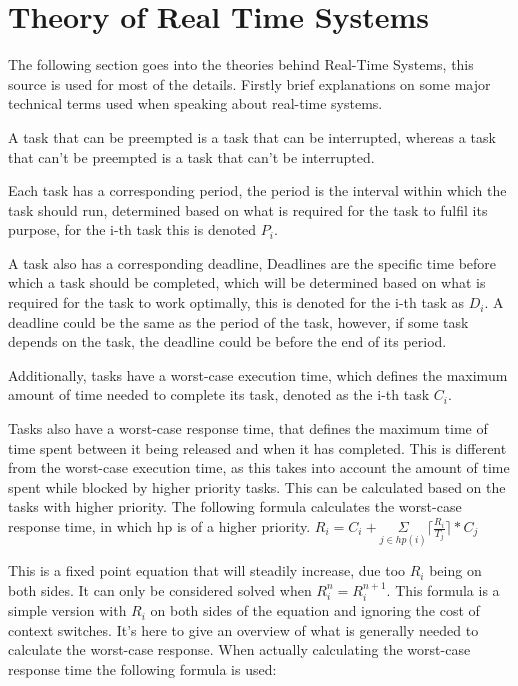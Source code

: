 \section{Theory of Real Time Systems}
The following section goes into the theories behind Real-Time Systems, this source\cite{RTSbook} is used for most of the details. Firstly brief explanations on some major technical terms used when speaking about real-time systems. %

A task that can be preempted is a task that can be interrupted, whereas a task that can't be preempted is a task that can't be interrupted.

Each task has a corresponding period, the period is the interval within which the task should run, determined based on what is required for the task to fulfil its purpose, for the i-th task this is denoted $P_{i}$.

A task also has a corresponding deadline, Deadlines are the specific time before which a task should be completed, which will be determined based on what is required for the task to work optimally, this is denoted for the i-th task as $ D_{i} $. A deadline could be the same as the period of the task, however, if some task depends on the task, the deadline could be before the end of its period. 

Additionally, tasks have a worst-case execution time, which defines the maximum amount of time needed to complete its task, denoted as the i-th task $C_{i}$.

Tasks also have a worst-case response time, that defines the maximum time of time spent between it being released and when it has completed. This is different from the worst-case execution time, as this takes into account the amount of time spent while blocked by higher priority tasks. This can be calculated based on the tasks with higher priority. The following formula calculates the worst-case response time, in which hp is of a higher priority. 
$R_{i} = C_{i} + \underset{j\in hp(i)}{\Sigma} \lceil\frac{R_{i}}{T_{j}}\rceil*C_{j} $

This is a fixed point equation that will steadily increase, due too $R_{i}$ being on both sides. It can only be considered solved when $ R_{i}^n = R_{i}^{n+1}$. This formula is a simple version with $R_{i}$ on both sides of the equation and ignoring the cost of context switches. It's here to give an overview of what is generally needed to calculate the worst-case response.  When actually calculating the worst-case response time the following formula is used:


